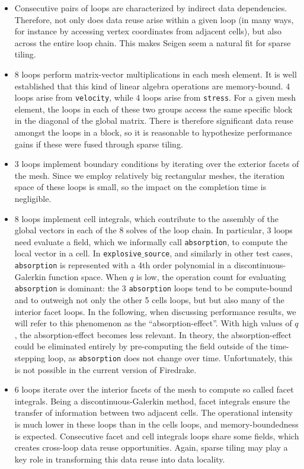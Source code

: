 \begin{itemize}
\item Consecutive pairs of loops are characterized by indirect data dependencies. Therefore, not only does data reuse arise within a given loop (in many ways, for instance by accessing vertex coordinates from adjacent cells), but also across the entire loop chain. This makes Seigen seem a natural fit for sparse tiling. 
\item 8 loops perform matrix-vector multiplications in each mesh element. It is well established that this kind of linear algebra operations are memory-bound. 4 loops arise from {\tt velocity}, while 4 loops arise from {\tt stress}. For a given mesh element, the loops in each of these two groups access the same specific block in the diagonal of the global matrix. There is therefore significant data reuse amongst the loops in a block, so it is reasonable to hypothesize performance gains if these were fused through sparse tiling.
\item 3 loops implement boundary conditions by iterating over the exterior facets of the mesh. Since we employ relatively big rectangular meshes, the iteration space of these loops is small, so the impact on the completion time is negligible.
\item 8 loops implement cell integrals, which contribute to the assembly of the global vectors in each of the 8 solves of the loop chain. In particular, 3 loops need evaluate a field, which we informally call {\tt absorption}, to compute the local vector in a cell. In {\tt explosive$\_$source}, and similarly in other test cases, {\tt absorption} is represented with a 4th order polynomial in a discontinuous-Galerkin function space. When $q$ is low, the operation count for evaluating {\tt absorption} is dominant: the 3 {\tt absorption} loops tend to be compute-bound and to outweigh not only the other 5 cells loops, but but also many of the interior facet loops. In the following, when discussing performance results, we will refer to this phenomenon as the ``absorption-effect''. With high values of $q$, the absorption-effect becomes less relevant. In theory, the absorption-effect could be eliminated entirely by pre-computing the field outside of the time-stepping loop, as  {\tt absorption} does not change over time. Unfortunately, this is not possible in the current version of Firedrake. 
\item 6 loops iterate over the interior facets of the mesh to compute so called facet integrals. Being a discontinuous-Galerkin method, facet integrals ensure the transfer of information between two adjacent cells. The operational intensity is much lower in these loops than in the cells loops, and memory-boundedness is expected. Consecutive facet and cell integrals loops share some fields, which creates cross-loop data reuse opportunities. Again, sparse tiling may play a key role in transforming this data reuse into data locality.
\end{itemize}



